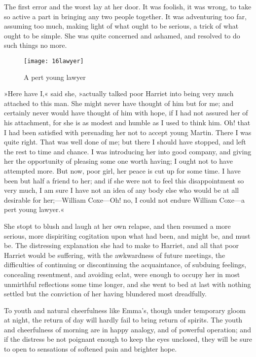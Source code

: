 The first error and the worst lay at her door. It was foolish, it was wrong, to take so active a part in bringing any two people together. It was adventuring too far, assuming too much, making light of what ought to be serious, a trick of what ought to be simple. She was quite concerned and ashamed, and resolved to do such things no more.

\begin{figure}[tbph]
\centering
\texttt{[image: 16lawyer]}
\caption{A pert young lawyer}
\end{figure}

»Here have I,« said she, »actually talked poor Harriet into being very much attached to this man. She might never have thought of him but for me; and certainly never would have thought of him with hope, if I had not assured her of his attachment, for she is as modest and humble as I used to think him. Oh! that I had been satisfied with persuading her not to accept young Martin. There I was quite right. That was well done of me; but there I should have stopped, and left the rest to time and chance. I was introducing her into good company, and giving her the opportunity of pleasing some one worth having; I ought not to have attempted more. But now, poor girl, her peace is cut up for some time. I have been but half a friend to her; and if she were not to feel this disappointment so very much, I am sure I have not an idea of any body else who would be at all desirable for her;—William Coxe—Oh! no, I could not endure William Coxe—a pert young lawyer.«

She stopt to blush and laugh at her own relapse, and then resumed a more serious, more dispiriting cogitation upon what had been, and might be, and must be. The distressing explanation she had to make to Harriet, and all that poor Harriet would be suffering, with the awkwardness of future meetings, the difficulties of continuing or discontinuing the acquaintance, of subduing feelings, concealing resentment, and avoiding eclat, were enough to occupy her in most unmirthful reflections some time longer, and she went to bed at last with nothing settled but the conviction of her having blundered most dreadfully.

To youth and natural cheerfulness like Emma's, though under temporary gloom at night, the return of day will hardly fail to bring return of spirits. The youth and cheerfulness of morning are in happy analogy, and of powerful operation; and if the distress be not poignant enough to keep the eyes unclosed, they will be sure to open to sensations of softened pain and brighter hope.

